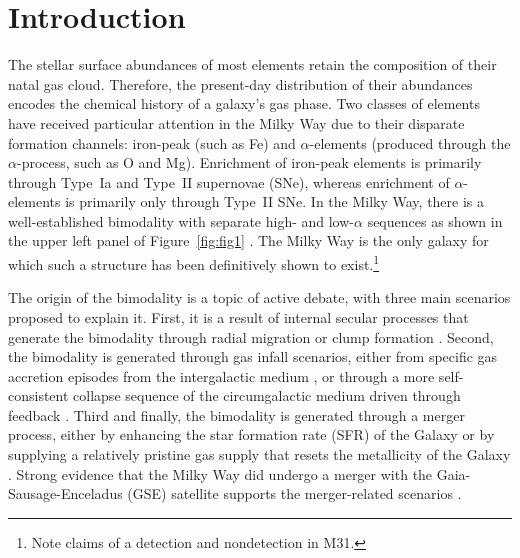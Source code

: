 \documentclass[twocolumn,linenumbers]{aastex631}
\begin{document}
\section{Introduction}\label{sec:intro}
The stellar surface abundances of most elements retain the composition of their natal gas cloud. Therefore, the present-day distribution of their abundances encodes the chemical history of a galaxy's gas phase. Two classes of elements have received particular attention in the Milky Way due to their disparate formation channels: iron-peak (such as Fe) and $\alpha$-elements (produced through the $\alpha$-process, such as O and Mg). Enrichment of iron-peak elements is primarily through Type~Ia and Type~II supernovae (SNe), whereas enrichment of $\alpha$-elements is primarily only through Type~II SNe. In the Milky Way, there is a well-established bimodality with separate high- and low-$\alpha$ sequences as shown in the upper left panel of Figure~\ref{fig:fig1} \citep{1996ASPC...92..307G,1998A&A...338..161F,2004AN....325....3F,2006MNRAS.367.1329R,2011A&A...535L..11A,2012A&A...545A..32A,2014A&A...562A..71B,2014ApJ...796...38N,2020MNRAS.493.2952H}. The Milky Way is the only galaxy for which such a structure has been definitively shown to exist.\footnote{Note claims of a detection \citep{2023ApJ...956L..14K} and nondetection \citep{2024IAUS..377..115N} in M31.}

The origin of the bimodality is a topic of active debate, with three main scenarios proposed to explain it. First, it is a result of internal secular processes that generate the bimodality through radial migration \citep{2009MNRAS.396..203S,2021MNRAS.507.5882S,2023MNRAS.523.3791C} or clump formation \citep{2019MNRAS.484.3476C,2020MNRAS.492.4716B,2021MNRAS.502..260B,2023ApJ...953..128G}. Second, the bimodality is generated through gas infall scenarios, either from specific gas accretion episodes from the intergalactic medium \citep{1997ApJ...477..765C,2009IAUS..254..191C,2017MNRAS.472.3637G,2019A&A...623A..60S}, or through a more self-consistent collapse sequence of the circumgalactic medium driven through feedback \citep{2021MNRAS.501.5176K}. Third and finally, the bimodality is generated through a merger process, either by enhancing the star formation rate (SFR) of the Galaxy \citep{2004ApJ...612..894B,2005ApJ...630..298B,2007ApJ...658...60B,2010MNRAS.402.1489R} or by supplying a relatively pristine gas supply that resets the metallicity of the Galaxy \citep{2020MNRAS.491.5435B,2024MNRAS.528L.122C}. Strong evidence that the Milky Way did undergo a merger with the Gaia-Sausage-Enceladus (GSE) satellite supports the merger-related scenarios \citep{2018MNRAS.478..611B,2018Natur.563...85H,2020ApJ...901...48N,2024ApJ...972..112C}.
\end{document}
